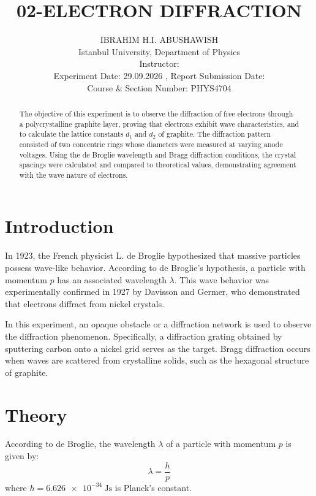 \documentclass[journal]{IEEEtran}
\begin{document}
\title{02-ELECTRON DIFFRACTION}
\author{IBRAHIM H.I. ABUSHAWISH \\
Istanbul University, Department of Physics \\
Instructor: \\
Experiment Date: 29.09.2026 , Report Submission Date: \\
Course \& Section Number: PHYS4704}


\maketitle

\begin{abstract}
The objective of this experiment is to observe the diffraction of free electrons through a polycrystalline graphite layer, proving that electrons exhibit wave characteristics, and to calculate the lattice constants $d_1$ and $d_2$ of graphite. The diffraction pattern consisted of two concentric rings whose diameters were measured at varying anode voltages. Using the de Broglie wavelength and Bragg diffraction conditions, the crystal spacings were calculated and compared to theoretical values, demonstrating agreement with the wave nature of electrons.
\end{abstract}

\section{Introduction}
In 1923, the French physicist L. de Broglie hypothesized that massive particles possess wave-like behavior. According to de Broglie's hypothesis, a particle with momentum $p$ has an associated wavelength $\lambda$. This wave behavior was experimentally confirmed in 1927 by Davisson and Germer, who demonstrated that electrons diffract from nickel crystals. 

In this experiment, an opaque obstacle or a diffraction network is used to observe the diffraction phenomenon. Specifically, a diffraction grating obtained by sputtering carbon onto a nickel grid serves as the target. Bragg diffraction occurs when waves are scattered from crystalline solids, such as the hexagonal structure of graphite.

\section{Theory}
According to de Broglie, the wavelength $\lambda$ of a particle with momentum $p$ is given by:
\begin{equation}
    \lambda = \frac{h}{p}
    \label{eq:debroglie}
\end{equation}
where $h = \SI{6.626e-34}{\joule\second}$ is Planck's constant.
\end{document}
